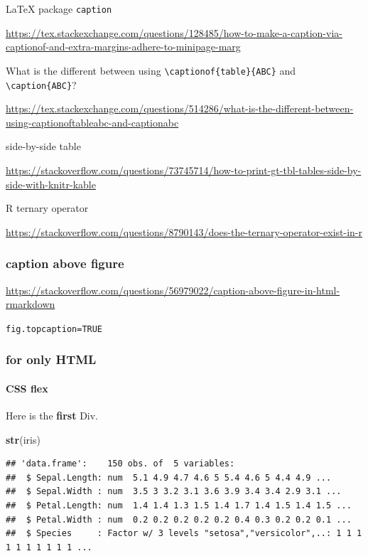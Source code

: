 \documentclass[
]{book}
\newenvironment{Shaded}{\begin{snugshade}}{\end{snugshade}}
\newcommand{\FunctionTok}[1]{\textcolor[rgb]{0.13,0.29,0.53}{\textbf{#1}}}
\newcommand{\NormalTok}[1]{#1}
\theoremstyle{definition}
\theoremstyle{definition}
\theoremstyle{definition}
\theoremstyle{definition}
\theoremstyle{remark}
\begin{document}
LaTeX package \texttt{caption}

\url{https://tex.stackexchange.com/questions/128485/how-to-make-a-caption-via-captionof-and-extra-margins-adhere-to-minipage-marg}

What is the different between using \texttt{\textbackslash{}captionof\{table\}\{ABC\}} and \texttt{\textbackslash{}caption\{ABC\}}?

\url{https://tex.stackexchange.com/questions/514286/what-is-the-different-between-using-captionoftableabc-and-captionabc}

side-by-side table

\url{https://stackoverflow.com/questions/73745714/how-to-print-gt-tbl-tables-side-by-side-with-knitr-kable}

R ternary operator

\url{https://stackoverflow.com/questions/8790143/does-the-ternary-operator-exist-in-r}

\subsubsection{caption above figure}\label{caption-above-figure}

\url{https://stackoverflow.com/questions/56979022/caption-above-figure-in-html-rmarkdown}

\texttt{fig.topcaption=TRUE}

\subsubsection{for only HTML}\label{for-only-html}

\paragraph{CSS flex}\label{css-flex}

Here is the \textbf{first} Div.

\begin{Shaded}
\begin{Highlighting}[]
\FunctionTok{str}\NormalTok{(iris)}
\end{Highlighting}
\end{Shaded}

\begin{verbatim}
## 'data.frame':    150 obs. of  5 variables:
##  $ Sepal.Length: num  5.1 4.9 4.7 4.6 5 5.4 4.6 5 4.4 4.9 ...
##  $ Sepal.Width : num  3.5 3 3.2 3.1 3.6 3.9 3.4 3.4 2.9 3.1 ...
##  $ Petal.Length: num  1.4 1.4 1.3 1.5 1.4 1.7 1.4 1.5 1.4 1.5 ...
##  $ Petal.Width : num  0.2 0.2 0.2 0.2 0.2 0.4 0.3 0.2 0.2 0.1 ...
##  $ Species     : Factor w/ 3 levels "setosa","versicolor",..: 1 1 1 1 1 1 1 1 1 1 ...
\end{verbatim}
\end{document}
